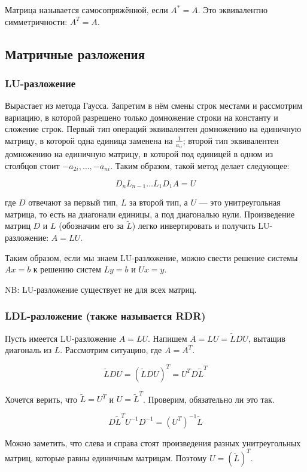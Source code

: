 \documentclass[12pt]{article}
\begin{document}
Матрица называется самосопряжённой, если $A^* = A$. Это эквивалентно симметричности: $A^T = A$.

\subsection{Матричные разложения}

\subsubsection{LU-разложение}

Вырастает из метода Гаусса. Запретим в нём смены строк местами и рассмотрим вариацию, в которой разрешено только домножение строки на константу и сложение строк. Первый тип операций эквивалентен домножению на единичную матрицу, в которой одна единица заменена на $\frac 1 {a_{ii}}$; второй тип эквивалентен домножению на единичную матрицу, в которой под единицей в одном из столбцов стоит $-a_{2i}, \ldots, -a_{ni}$. Таким образом, такой метод делает следующее:

\[
D_n L_{n-1} \ldots L_1 D_1 A = U
\]

где $D$ отвечают за первый тип, $L$ за второй тип, а $U$ — это унитреугольная матрица, то есть на диагонали единицы, а под диагональю нули. Произведение матриц $D$ и $L$ (обозначим его за $\tilde{L}$) легко инвертировать и получить LU-разложение: $A = LU$.

Таким образом, если мы знаем LU-разложение, можно свести решение системы $Ax = b$ к решению систем $Ly = b$ и $Ux = y$.

NB: LU-разложение существует не для всех матриц.

\subsubsection{LDL-разложение (также называется RDR)}

Пусть имеется LU-разложение $A = LU$. Напишем $A = LU = \tilde{L} D U$, вытащив диагональ из $L$. Рассмотрим ситуацию, где $A = A^T$.

\[
\tilde{L} D U = (\tilde{L} D U)^T = U^T D \tilde{L}^T
\]

Хочется верить, что $\tilde{L} = U^T$ и $U = \tilde{L}^T$. Проверим, обязательно ли это так.

\[
D \tilde{L}^T U^{-1} D^{-1} = (U^T)^{-1} \tilde{L}
\]

Можно заметить, что слева и справа стоят произведения разных унитреугольных матриц, которые равны единичным матрицам. Поэтому $U = (\tilde{L})^T$.
\end{document}

